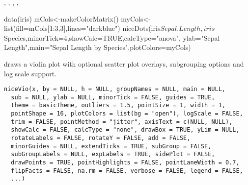 \documentclass[a4paper]{book}
\begin{document}
%
\begin{SeeAlso}\relax
{}, , , , 
\end{SeeAlso}
%
\begin{Examples}
\begin{ExampleCode}
data(iris)
mCols<-makeColorMatrix()
myCols<-list(fill=mCols[1:3,3],lines="darkblue")
niceDots(iris$Sepal.Length,iris$Species,minorTick=4,showCalc=TRUE,calcType="anova",
    ylab="Sepal Length",main="Sepal Length by Species",plotColors=myCols)

\end{ExampleCode}
\end{Examples}
%
\begin{Description}\relax
draws a violin plot with optional scatter plot overlays, subgrouping options and log scale support.
\end{Description}
%
\begin{Usage}
\begin{verbatim}
niceVio(x, by = NULL, h = NULL, groupNames = NULL, main = NULL,
  sub = NULL, ylab = NULL, minorTick = FALSE, guides = TRUE,
  theme = basicTheme, outliers = 1.5, pointSize = 1, width = 1,
  pointShape = 16, plotColors = list(bg = "open"), logScale = FALSE,
  trim = FALSE, pointMethod = "jitter", axisText = c(NULL, NULL),
  showCalc = FALSE, calcType = "none", drawBox = TRUE, yLim = NULL,
  rotateLabels = FALSE, rotateY = FALSE, add = FALSE,
  minorGuides = NULL, extendTicks = TRUE, subGroup = FALSE,
  subGroupLabels = NULL, expLabels = TRUE, sidePlot = FALSE,
  drawPoints = TRUE, pointHighlights = FALSE, pointLaneWidth = 0.7,
  flipFacts = FALSE, na.rm = FALSE, verbose = FALSE, legend = FALSE,
  ...)
\end{verbatim}
\end{Usage}
%
\end{document}
